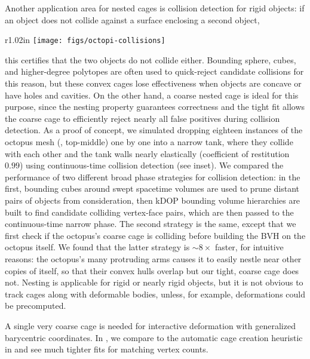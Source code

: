 Another application area for nested cages is collision detection for rigid
objects: if an object does not collide against a surface enclosing a second
object, 
%
\begin{wrapfigure}{r}{1.02in}
%
\centering
%
\texttt{[image: figs/octopi-collisions]}
%
\end{wrapfigure}
%
this certifies that the two objects do not collide either.
%
Bounding sphere, cubes, and
higher-degree polytopes are often used to quick-reject candidate collisions for
this reason, but these convex cages lose effectiveness when objects are concave
or have holes and cavities. On the other hand, a coarse nested cage is ideal
for this purpose, since the nesting property guarantees correctness and the
tight fit allows the coarse cage to efficiently reject nearly all false
positives during collision detection. As a proof of concept, we simulated
dropping eighteen instances of the octopus mesh (,
top-middle) one by one into a narrow tank, where they collide with each other
and the tank walls nearly elastically (coefficient of restitution $0.99$) using
continuous-time collision detection (see inset). We compared the performance of
two different broad phase strategies for collision detection: in the first,
bounding cubes around swept spacetime volumes are used to prune distant pairs
of objects from consideration, then kDOP bounding volume hierarchies are built
to find candidate colliding vertex-face pairs, which are then passed to the
continuous-time narrow phase. The second strategy is the same, except
that we first check if the octopus's coarse cage is colliding before building
the BVH on the octopus itself. We found that the latter strategy is 
$\sim 8\times$ faster, for intuitive reasons: the octopus's many
protruding arms causes it to easily nestle near other copies of itself, so that
their convex hulls overlap but our tight, coarse cage does not.
%
Nesting is applicable for rigid or nearly rigid objects, but it is not obvious
to track cages along with deformable bodies, unless, for example, deformations
could be precomputed.

A single very coarse cage is needed for interactive deformation with
generalized barycentric coordinates.
%
In , we compare to the automatic cage creation
heuristic in \cite{Ben-Chen:2009:SDT} and see much tighter fits for matching
vertex counts.

